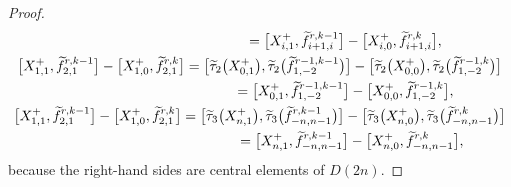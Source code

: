 \documentclass[pdftex]{sigma}
\numberwithin{equation}{section}
\theoremstyle{definition}
\begin{document}
\begin{proof}
\begin{gather}
\hphantom{\bigl[X^+_{1,1},\widetilde{f}_{2,1}^{r,k-1}\bigr]-\bigl[X^+_{1,0},\widetilde{f}_{2,1}^{r,k}\bigr]}{}
=\bigl[X^+_{i,1},\widetilde{f}_{i+1,i}^{r,k-1}\bigr]-\bigl[X^+_{i,0},\widetilde{f}_{i+1,i}^{r,k}\bigr],\label{eq94}\\
\bigl[X^+_{1,1},\widetilde{f}_{2,1}^{r,k-1}\bigr]-\bigl[X^+_{1,0},\widetilde{f}_{2,1}^{r,k}\bigr]
=\bigl[\widetilde{\tau}_2\bigl(X^+_{0,1}\bigr),\widetilde{\tau}_2\bigl(\widetilde{f}_{1,-2}^{r-1,k-1}\bigr)\bigr]-\bigl[\widetilde{\tau}_2\bigl(X^+_{0,0}\bigr),\widetilde{\tau}_2\bigl(\widetilde{f}_{1,-2}^{r-1,k}\bigr)\bigr]\nonumber\\
\hphantom{\bigl[X^+_{1,1},\widetilde{f}_{2,1}^{r,k-1}\bigr]-\bigl[X^+_{1,0},\widetilde{f}_{2,1}^{r,k}\bigr]}{}
=\bigl[X^+_{0,1},\widetilde{f}_{1,-2}^{r-1,k-1}\bigr]-\bigl[X^+_{0,0},\widetilde{f}_{1,-2}^{r-1,k}\bigr],\nonumber\\%
\bigl[X^+_{1,1},\widetilde{f}_{2,1}^{r,k-1}\bigr]-\bigl[X^+_{1,0},\widetilde{f}_{2,1}^{r,k}\bigr]
=\bigl[\widetilde{\tau}_3\bigl(X^+_{n,1}\bigr),\widetilde{\tau}_3\bigl(\widetilde{f}_{-n,n-1}^{r,k-1}\bigr)\bigr]
-\bigl[\widetilde{\tau}_3\bigl(X^+_{n,0}\bigr),\widetilde{\tau}_3\bigl(\widetilde{f}_{-n,n-1}^{r,k}\bigr)\bigr]\nonumber\\
\hphantom{\bigl[X^+_{1,1},\widetilde{f}_{2,1}^{r,k-1}\bigr)\bigr]-\bigl[X^+_{1,0},\widetilde{f}_{2,1}^{r,k}\bigr)\bigr]}{}
=\bigl[X^+_{n,1},\widetilde{f}_{-n,n-1}^{r,k-1}\bigr]-\bigl[X^+_{n,0},\widetilde{f}_{-n,n-1}^{r,k}\bigr],\nonumber%
\end{gather}
because the right-hand sides are central elements of $D(2n)$.
\end{proof}
\end{document}
